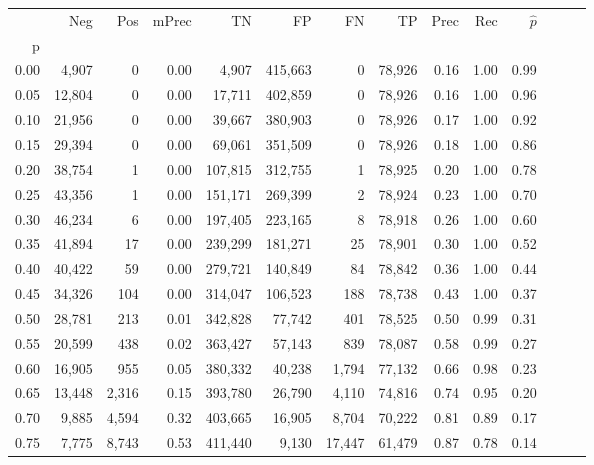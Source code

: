 \begin{tabular}{rrrrrrrrrrrrrr}
\toprule
{} &     Neg &     Pos & mPrec &       TN &       FP &      FN &      TP &  Prec &   Rec & $\hat{p}$ \\
p    &         &         &       &          &          &         &         &       &       &           \\
\midrule
0.00 &   4,907 &       0 &  0.00 &    4,907 &  415,663 &       0 &  78,926 &  0.16 &  1.00 &      0.99 \\
0.05 &  12,804 &       0 &  0.00 &   17,711 &  402,859 &       0 &  78,926 &  0.16 &  1.00 &      0.96 \\
0.10 &  21,956 &       0 &  0.00 &   39,667 &  380,903 &       0 &  78,926 &  0.17 &  1.00 &      0.92 \\
0.15 &  29,394 &       0 &  0.00 &   69,061 &  351,509 &       0 &  78,926 &  0.18 &  1.00 &      0.86 \\
0.20 &  38,754 &       1 &  0.00 &  107,815 &  312,755 &       1 &  78,925 &  0.20 &  1.00 &      0.78 \\
0.25 &  43,356 &       1 &  0.00 &  151,171 &  269,399 &       2 &  78,924 &  0.23 &  1.00 &      0.70 \\
0.30 &  46,234 &       6 &  0.00 &  197,405 &  223,165 &       8 &  78,918 &  0.26 &  1.00 &      0.60 \\
0.35 &  41,894 &      17 &  0.00 &  239,299 &  181,271 &      25 &  78,901 &  0.30 &  1.00 &      0.52 \\
0.40 &  40,422 &      59 &  0.00 &  279,721 &  140,849 &      84 &  78,842 &  0.36 &  1.00 &      0.44 \\
0.45 &  34,326 &     104 &  0.00 &  314,047 &  106,523 &     188 &  78,738 &  0.43 &  1.00 &      0.37 \\
0.50 &  28,781 &     213 &  0.01 &  342,828 &   77,742 &     401 &  78,525 &  0.50 &  0.99 &      0.31 \\
0.55 &  20,599 &     438 &  0.02 &  363,427 &   57,143 &     839 &  78,087 &  0.58 &  0.99 &      0.27 \\
0.60 &  16,905 &     955 &  0.05 &  380,332 &   40,238 &   1,794 &  77,132 &  0.66 &  0.98 &      0.23 \\
0.65 &  13,448 &   2,316 &  0.15 &  393,780 &   26,790 &   4,110 &  74,816 &  0.74 &  0.95 &      0.20 \\
0.70 &   9,885 &   4,594 &  0.32 &  403,665 &   16,905 &   8,704 &  70,222 &  0.81 &  0.89 &      0.17 \\
0.75 &   7,775 &   8,743 &  0.53 &  411,440 &    9,130 &  17,447 &  61,479 &  0.87 &  0.78 &      0.14 \\

\end{tabular}
